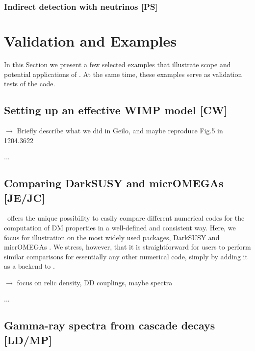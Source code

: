 \subsubsection{Indirect detection with neutrinos {\bf [PS]}}
\label{code_nu}



\section{Validation and  Examples}
\label{examples}

In this Section we present a few selected  examples that illustrate scope and
potential applications of \DB. At the same time, these examples serve as validation
tests of the code.

\subsection{Setting up an effective WIMP model {\bf [CW]}}

$\to$ Briefly describe what we did in Geilo, and maybe reproduce Fig.5 in 1204.3622

\medskip
...

\subsection{Comparing {\sf DarkSUSY} and {\sf micrOMEGAs} {\bf [JE/JC]}}

\DB\ offers the unique possibility to easily compare different numerical codes for the computation of DM properties
in a well-defined and consistent way. Here, we focus for illustration on the most widely used packages, {\sf DarkSUSY} 
\cite{xxx} and {\sf micrOMEGAs} \cite{xxx}. We stress, however, that it is straightforward for users to 
perform similar comparisons for essentially any other numerical code, simply by adding it as a backend to \DB.

\medskip
$\to$ focus on relic density, DD couplings, maybe spectra

\medskip
...


\subsection{Gamma-ray spectra from cascade decays {\bf [LD/MP]}}

